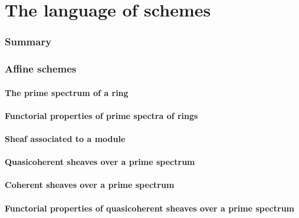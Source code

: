 \clearpage

\setcounter{subsection}{0}
\setcounter{section}{0}
\part{The language of schemes}
    
    \section*{Summary}
    \label{1-schemes.summary}
    

    \section{Affine schemes}
       
        \subsection{The prime spectrum of a ring}
        
       
        \subsection{Functorial properties of prime spectra of rings}
        
       
        \subsection{Sheaf associated to a module}
        
       
        \subsection{Quasicoherent sheaves over a prime spectrum}
        
      
        \subsection{Coherent sheaves over a prime spectrum}
        
       
        \subsection{Functorial properties of quasicoherent sheaves over a prime spectrum}
        
       
